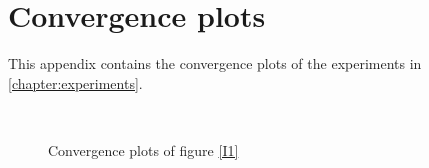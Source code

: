 
\chapter{Convergence plots} %

\label{AppendixA} %


This appendix contains the convergence plots of the experiments in \cref{chapter:experiments}.

\begin{figure}[h!]
  \centering
  ~
  ~
  ~
  \caption{Convergence plots of figure \ref{I1}}\label{I1con}
\end{figure}
